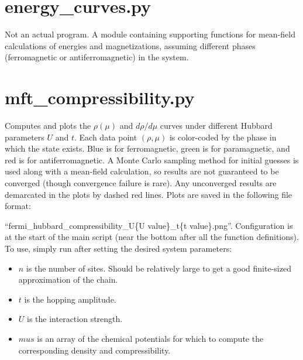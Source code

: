 \documentclass{article}
\newcommand{\p}{\newline\newline}		%
\begin{document}
\section{energy\_curves.py}
Not an actual program. A module containing supporting functions for mean-field calculations of energies and magnetizations, assuming different phases (ferromagnetic or antiferromagnetic) in the system.

\section{mft\_compressibility.py}
Computes and plots the $\rho(\mu)$ and $d\rho/d\mu$ curves under different Hubbard parameters $U$ and $t$. Each data point $(\rho, \mu)$ is color-coded by the phase in which the state exists. Blue is for ferromagnetic, green is for paramagnetic, and red is for antiferromagnetic. A Monte Carlo sampling method for initial guesses is used along with a mean-field calculation, so results are not guaranteed to be converged (though convergence failure is rare). Any unconverged results are demarcated in the plots by dashed red lines.
\p
Plots are saved in the following file format:

``fermi\_hubbard\_compressibility\_U\{U value\}\_t\{t value\}.png''.
\p
Configuration is at the start of the main script (near the bottom after all the function definitions). To use, simply run after setting the desired system parameters:
\begin{itemize}
\item $n$ is the number of sites. Should be relatively large to get a good finite-sized approximation of the chain.
\item $t$ is the hopping amplitude.
\item $U$ is the interaction strength.
\item $mus$ is an array of the chemical potentials for which to compute the corresponding density and compressibility.
\end{itemize}
\end{document}
